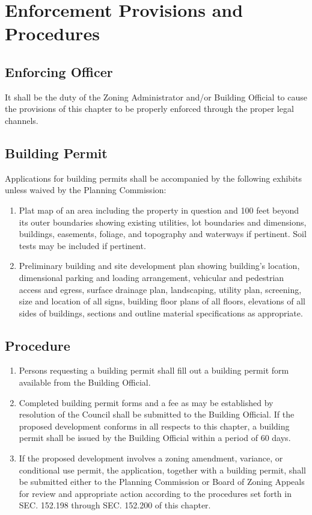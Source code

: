 \section{Enforcement Provisions and Procedures}
\subsection{Enforcing Officer}
It shall be the duty of the Zoning Administrator and/or Building Official to cause the provisions of this chapter to be properly enforced through the proper legal channels.
\subsection{Building Permit}
Applications for building permits shall be accompanied by the following exhibits unless waived by the Planning Commission:
\begin{enumerate}[{\indent}1)]
    \item Plat map of an area including the property in question and 100 feet beyond its outer boundaries showing existing utilities, lot boundaries and dimensions, buildings, easements, foliage, and topography and waterways if pertinent. Soil tests may be included if pertinent.
    \item Preliminary building and site development plan showing building’s location, dimensional parking and loading arrangement, vehicular and pedestrian access and egress, surface drainage plan, landscaping, utility plan, screening, size and location of all signs, building floor plans of all floors, elevations of all sides of buildings, sections and outline material specifications as appropriate.
\end{enumerate}
\subsection{Procedure}
\begin{enumerate}[{\indent}1)]
    \item Persons requesting a building permit shall fill out a building permit form available from the Building Official.
    \item Completed building permit forms and a fee as may be established by resolution of the Council shall be submitted to the Building Official.  If the proposed development conforms in all respects to this chapter, a building permit shall be issued by the Building Official within a period of 60 days.
    \item If the proposed development involves a zoning amendment, variance, or conditional use permit, the application, together with a building permit, shall be submitted either to the Planning Commission or Board of Zoning Appeals for review and appropriate action according to the procedures set forth in SEC. 152.198 through SEC. 152.200 of this chapter.
\end{enumerate}
